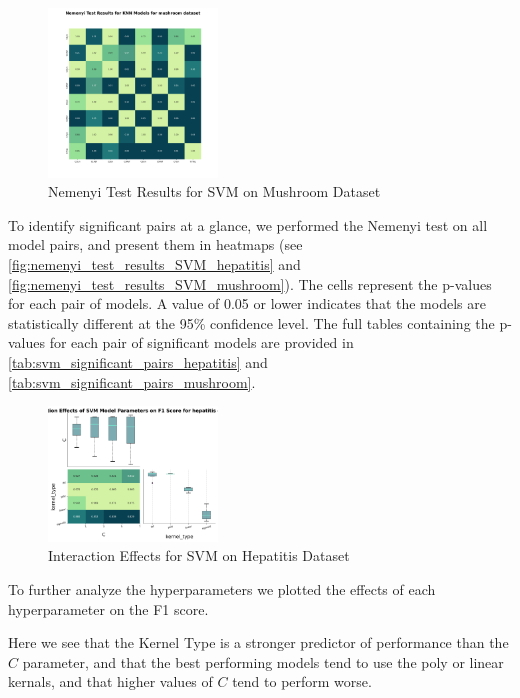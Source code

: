 \begin{figure}
    \centering
    \includegraphics[width=0.4\textwidth]{figures/nemenyi_test_results_SVM_mushroom.png}
    \caption{Nemenyi Test Results for SVM on Mushroom Dataset}
    \label{fig:nemenyi_test_results_SVM_mushroom}
\end{figure}

To identify significant pairs at a glance, we performed the Nemenyi test on all model pairs,
and present them in heatmaps (see \autoref{fig:nemenyi_test_results_SVM_hepatitis} and \autoref{fig:nemenyi_test_results_SVM_mushroom}).
The cells represent the p-values for each pair of models. A value of 0.05 or lower indicates that the models are statistically different
at the 95\% confidence level. The full tables containing the p-values for each pair of significant models are provided in \autoref{tab:svm_significant_pairs_hepatitis} and \autoref{tab:svm_significant_pairs_mushroom}.




\begin{figure}
    \centering
    \includegraphics[width=0.4\textwidth]{figures/interaction_effects_SVM_hepatitis.png}
    \caption{Interaction Effects for SVM on Hepatitis Dataset}
    \label{fig:interaction_effects_SVM_hepatitis}
\end{figure}

To further analyze the hyperparameters we plotted the effects of each hyperparameter on the F1 score.

Here we see that the Kernel Type is a stronger predictor of performance than the $C$ parameter, and that
the best performing models tend to use the poly or linear kernals, and that higher values of $C$ tend to perform worse.
